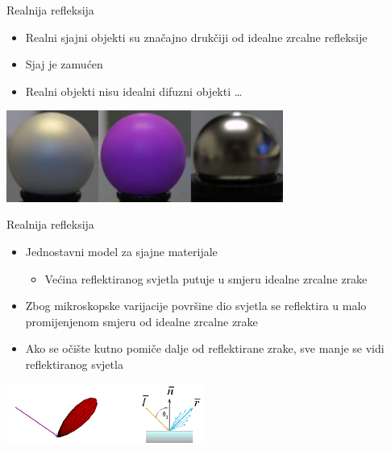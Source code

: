 \documentclass[9pt]{beamer}
\begin{document}
\begin{frame}{Realnija refleksija}
	\begin{itemize} %
		\item Realni sjajni objekti su značajno drukčiji od idealne zrcalne refleksije
		\item Sjaj je zamućen
		\item Realni objekti nisu idealni difuzni objekti \ldots
	\end{itemize}
	\begin{center}
		\includegraphics[height=3cm]{slike/glossy_material.png}
	\end{center}
\end{frame}

\begin{frame}{Realnija refleksija}
	\begin{itemize} %
		\item Jednostavni model za sjajne materijale
		\begin{itemize}
			\item Većina reflektiranog svjetla putuje u smjeru idealne zrcalne zrake
		\end{itemize}
		\item Zbog mikroskopske varijacije površine dio svjetla se reflektira u malo promijenjenom smjeru od idealne zrcalne zrake
		\item Ako se očište kutno pomiče dalje od reflektirane zrake, sve manje se vidi reflektiranog svjetla
	\end{itemize}
	
	\begin{center}
		\includegraphics[height=2cm]{slike/specular_real_refl.png}
	\end{center}
\end{frame}
\end{document}
